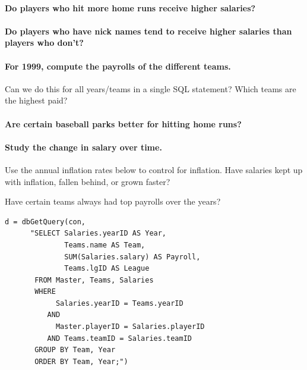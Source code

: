 \paragraph{Do players who hit more home runs receive higher salaries?}

\paragraph{Do players who have nick names tend to receive higher salaries than players who don't?}

\paragraph{For 1999, compute the payrolls of the different teams.}
Can we do this for all years/teams in a single SQL statement? 
Which teams are the highest paid?

\paragraph{Are certain baseball parks better for hitting home runs?}

\paragraph{Study the change in salary over time.} 
Use the annual inflation
rates below to control for inflation. Have salaries kept up with
inflation, fallen behind, or grown faster? 

Have certain teams always had top payrolls over the years?

\begin{verbatim}
d = dbGetQuery(con,
      "SELECT Salaries.yearID AS Year,
              Teams.name AS Team,
              SUM(Salaries.salary) AS Payroll,
              Teams.lgID AS League
       FROM Master, Teams, Salaries
       WHERE
            Salaries.yearID = Teams.yearID
          AND
            Master.playerID = Salaries.playerID
          AND Teams.teamID = Salaries.teamID
       GROUP BY Team, Year
       ORDER BY Team, Year;")
\end{verbatim}

